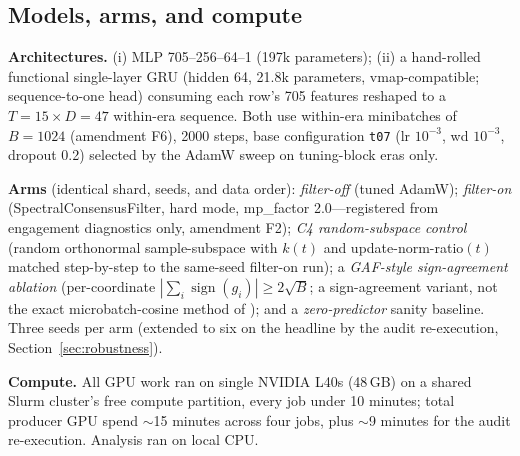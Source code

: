 \subsection{Models, arms, and compute}
\label{sec:method-models}

\textbf{Architectures.} (i) MLP 705--256--64--1 (197k parameters); (ii) a
hand-rolled functional single-layer GRU (hidden 64, 21.8k parameters,
vmap-compatible; sequence-to-one head) consuming each row's 705 features
reshaped to a $T{=}15 \times D{=}47$ within-era sequence. Both use
within-era minibatches of $B{=}1024$ (amendment F6), 2000 steps, base
configuration \texttt{t07} (lr $10^{-3}$, wd $10^{-3}$, dropout 0.2)
selected by the AdamW sweep on tuning-block eras only.

\textbf{Arms} (identical shard, seeds, and data order): \emph{filter-off}
(tuned AdamW); \emph{filter-on} (SpectralConsensusFilter, hard mode,
mp\_factor 2.0---registered from engagement diagnostics only, amendment
F2); \emph{C4 random-subspace control} (random orthonormal sample-subspace
with $k(t)$ and update-norm-ratio$(t)$ matched step-by-step to the
same-seed filter-on run); a \emph{GAF-style sign-agreement ablation}
(per-coordinate $|\sum_i \operatorname{sign}(g_{i})| \geq 2\sqrt{B}$; a
sign-agreement variant, not the exact microbatch-cosine method of
\citet{chaubard2024gradientagreementfiltering}); and a \emph{zero-predictor}
sanity baseline. Three seeds per arm (extended to six on the headline by the
audit re-execution, Section~\ref{sec:robustness}).

\textbf{Compute.} All GPU work ran on single NVIDIA L40s (48\,GB) on a
shared Slurm cluster's free compute partition, every job under 10 minutes;
total producer GPU spend $\sim$15 minutes across four jobs, plus
$\sim$9 minutes for the audit re-execution. Analysis ran on local CPU.
